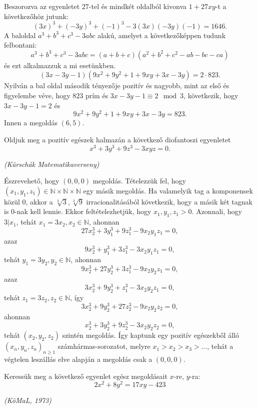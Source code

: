 \begin{solution}
	Beszorozva az egyenletet $27$-tel és mindkét oldalból kivonva $1+27xy$-t
	a következőhöz jutunk: 
	\[
	(3x)^{3}+(-3y)^{3}+(-1)^{3}-3(3x)(-3y)(-1)=1646.
	\]
	A baloldal $a^{3}+b^{3}+c^{3}-3abc$ alakú, amelyet a következőképpen
	tudunk felbontani: 
	\[
	a^{3}+b^{3}+c^{3}-3abc=(a+b+c)(a^{2}+b^{2}+c^{2}-ab-bc-ca)
	\]
	és ezt alkalmazzuk a mi esetünkben. 
	\[
	(3x-3y-1)(9x^{2}+9y^{2}+1+9xy+3x-3y)=2\cdot823.
	\]
	Nyilván a bal oldal második tényezője pozitív és nagyobb, mint az
	első és figyelembe véve, hogy $823$ prím és $3x-3y-1\equiv2\mod 3$,
	következik, hogy $3x-3y-1=2$ és 
	\[
	9x^{2}+9y^{2}+1+9xy+3x-3y=823.
	\]
	Innen a megoldás $(6,5)$. 
\end{solution}
\begin{extraproblem}
	Oldjuk meg a pozitív egészek halmazán a következő diofantoszi egyenletet
	\[
	x^{3}+3y^{3}+9z^{3}-3xyz=0.
	\]
	
	\emph{(Kürschák Matematikaverseny) }
\end{extraproblem}

\begin{solution}
	Észrevehető, hogy $(0,0,0)$ megoldás. Tételezzük fel, hogy $(x_{1},y_{1},z_{1})\in\mathbb{N}\times\mathbb{N}\times\mathbb{N}$
	egy másik megoldás. Ha valamelyik tag a komponensek közül 0, akkor
	a $\sqrt[3]{3},\sqrt[3]{9}$ irracionalitásából következik, hogy a
	másik két tagnak is 0-nak kell lennie. Ekkor feltételezhetjük, hogy
	$x_{1},y_{1},z_{1}>0$. Azonnali, hogy $3|x_{1}$, tehát $x_{1}=3x_{2},x_{2}\in\mathbb{N}$,
	ahonnan 
	\[
	27x_{2}^{3}+3y_{1}^{3}+9z_{1}^{3}-9x_{2}y_{1}z_{1}=0,
	\]
	azaz 
	\[
	9x_{2}^{3}+y_{1}^{3}+3z_{1}^{3}-3x_{2}y_{1}z_{1}=0,
	\]
	tehát $y_{1}=3y_{2},y_{2}\in\mathbb{N}$, ahonnan 
	\[
	9x_{2}^{3}+27y_{2}^{3}+3z_{1}^{3}-9x_{2}y_{2}z_{1}=0,
	\]
	azaz 
	\[
	3x_{2}^{3}+9y_{2}^{3}+z_{1}^{3}-3x_{2}y_{2}z_{1}=0,
	\]
	tehát $z_{1}=3z_{2},z_{2}\in\mathbb{N}$, így 
	\[
	3x_{2}^{3}+9y_{2}^{3}+27z_{2}^{3}-9x_{2}y_{2}z_{2}=0,
	\]
	ahonnan 
	\[
	x_{2}^{3}+3y_{2}^{3}+9z_{2}^{3}-3x_{2}y_{2}z_{2}=0,
	\]
	tehát $(x_{2},y_{2},z_{2})$ szintén megoldás. Így kaptunk egy pozitív
	egészekből álló $(x_{n},y_{n},z_{n})_{n\ge1}$ számhármas-sorozatot,
	melyre $x_{1}>x_{2}>x_{3}>\dots$, tehát a végtelen leszállás elve
	alapján a megoldás csak a $(0,0,0)$. 
\end{solution}
\begin{extraproblem}
	Keressük meg a következő egyenlet egész megoldásait $x$-re, $y$-ra:
	\[
	2x^{2}+8y^{2}=17xy-423
	\]
	
	\emph{(KöMaL, 1973) }
\end{extraproblem}


